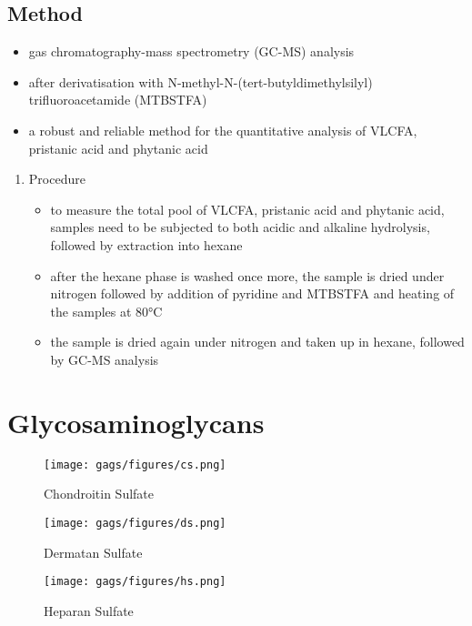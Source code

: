 \documentclass[12pt]{scrartcl}
\begin{document}
\subsection{Method}
\label{sec:orgca00c8b}
\begin{itemize}
\item gas chromatography-mass spectrometry (GC-MS) analysis
\item after derivatisation with N-methyl-N-(tert-butyldimethylsilyl)
trifluoroacetamide (MTBSTFA)
\item a robust and reliable method for the quantitative analysis of VLCFA,
pristanic acid and phytanic acid
\end{itemize}

\begin{enumerate}
\item Procedure
\label{sec:org95baffc}
\begin{itemize}
\item to measure the total pool of VLCFA, pristanic acid and phytanic
acid, samples need to be subjected to both acidic and alkaline
hydrolysis, followed by extraction into hexane
\item after the hexane phase is washed once more, the sample is dried
under nitrogen followed by addition of pyridine and MTBSTFA and
heating of the samples at 80°C
\item the sample is dried again under nitrogen and taken up in hexane,
followed by GC-MS analysis
\end{itemize}
\end{enumerate}
\section{Glycosaminoglycans}
\label{sec:org0699982}
\begin{figure}[htbp]
\centering
\texttt{[image: gags/figures/cs.png]}
\caption{\label{fig:orgdfd2dcb}Chondroitin Sulfate}
\end{figure}


\begin{figure}[htbp]
\centering
\texttt{[image: gags/figures/ds.png]}
\caption{\label{fig:org237805a}Dermatan Sulfate}
\end{figure}


\begin{figure}[htbp]
\centering
\texttt{[image: gags/figures/hs.png]}
\caption{\label{fig:org5fde7e1}Heparan Sulfate}
\end{figure}
\end{document}
